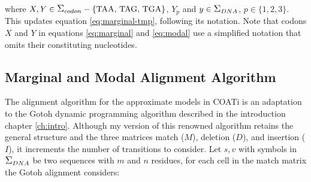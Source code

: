 \noindent where $X, Y \in \grande{\Sigma}_{codon} - \{\text{TAA, TAG, TGA} \}$, $Y_p$ and $y \in \grande{\Sigma}_{DNA}$, $p \in \{1, 2, 3\}$. This updates equation \ref{eq:marginal-tmp}, following its notation. Note that codons $X$ and $Y$ in equations \ref{eq:marginal} and \ref{eq:modal} use a simplified notation that omits their constituting nucleotides.
%

\subsection{Marginal and Modal Alignment Algorithm} %

The alignment algorithm for the approximate models in COATi is an adaptation to the Gotoh dynamic programming algorithm \citep{gotoh_1982} described in the introduction chapter \ref{ch:intro}. Although my version of this renowned algorithm retains the general structure and the three matrices match ($M$), deletion ($D$), and insertion ($I$), it increments the number of transitions to consider. Let $s, v$ with symbols in  $\grande{\Sigma}_{DNA}$ be two sequences with $m$ and $n$ residues, for each cell in the match matrix the Gotoh alignment considers:

